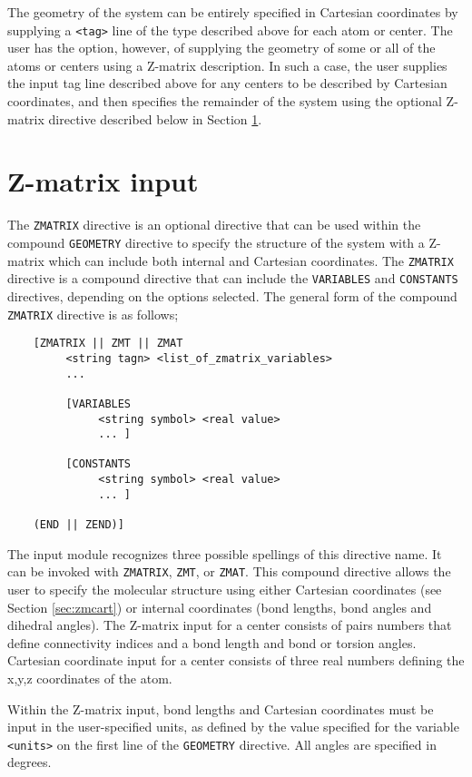 The geometry of the system can be entirely specified in Cartesian coordinates
by supplying a \verb+<tag>+ line of the type described above for each atom
or center.  The user has
the option, however, of supplying the geometry of some or all of the atoms 
or centers using a Z-matrix description.  In such a case, the user supplies
the input tag line described above for any centers 
to be described by Cartesian coordinates, and then specifies the remainder
of the system using the optional
Z-matrix directive described below in Section \ref{sec:Z-matrix}.

\section{Z-matrix input}
\label{sec:Z-matrix}

The \verb+ZMATRIX+ directive is an optional directive that can be used within
the compound \verb+GEOMETRY+ directive to specify the structure of the system with a
Z-matrix which can include both internal and Cartesian coordinates. 
The \verb+ZMATRIX+ directive is a compound
directive that can include the \verb+VARIABLES+ and \verb+CONSTANTS+
directives, depending on the options selected.  The general form of the 
compound \verb+ZMATRIX+ 
directive is as follows;
\begin{verbatim}
    [ZMATRIX || ZMT || ZMAT
         <string tagn> <list_of_zmatrix_variables> 
         ... 

         [VARIABLES
              <string symbol> <real value>
              ... ]
 
         [CONSTANTS
              <string symbol> <real value>
              ... ]

    (END || ZEND)]
\end{verbatim}

The input module recognizes three possible spellings of this directive name.
It can be invoked with \verb+ZMATRIX+, \verb+ZMT+, or \verb+ZMAT+.
This compound directive allows the user to specify
the molecular structure using
either Cartesian coordinates (see Section \ref{sec:zmcart}) or internal
coordinates (bond lengths, bond angles and dihedral angles).  The
Z-matrix input for a center consists of pairs numbers that define
connectivity indices and a bond length and bond or torsion angles.
Cartesian coordinate input for a center consists of three real numbers defining the
x,y,z coordinates of the atom.  

Within the Z-matrix input, bond lengths and Cartesian coordinates must
be input in the user-specified units, as defined by the value specified
for the variable \verb+<units>+ on the first line of the \verb+GEOMETRY+
directive.  All angles are specified in
degrees.

